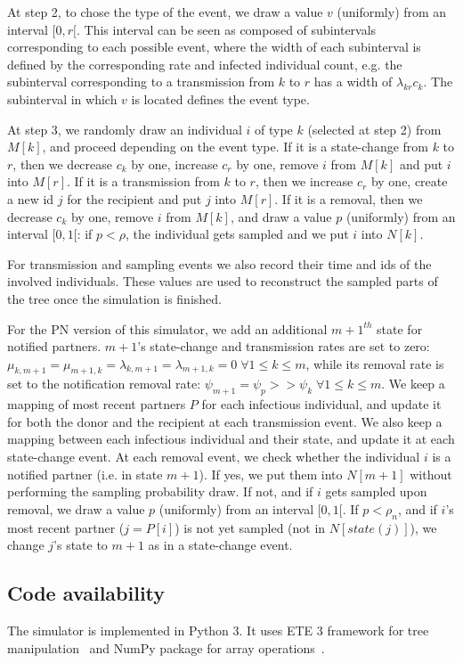 \documentclass[a4paper,10pt]{article}
\begin{document}
At step 2, to chose the type of the event, we draw a value $v$ (uniformly) from an interval $[0, r[$. This interval can be seen as composed of subintervals corresponding to each possible event, where the width of each subinterval is defined by the corresponding rate and infected individual count, e.g. the subinterval corresponding to a transmission from $k$ to $r$ has a width of $\lambda_{kr}c_k$. The subinterval in which $v$ is located defines the event type.

At step 3, we randomly draw an individual $i$ of type $k$ (selected at step 2) from $M[k]$, and proceed depending on the event type. If it is a state-change from $k$ to $r$, then we decrease $c_k$ by one, increase $c_r$ by one, remove $i$ from $M[k]$ and put $i$ into $M[r]$. If it is a transmission from $k$ to $r$, then we increase $c_r$ by one, create a new id $j$ for the recipient and put $j$ into $M[r]$. If it is a removal, then we decrease $c_k$ by one, remove $i$ from $M[k]$, and draw a value $p$ (uniformly) from an interval $[0, 1[$: if $p < \rho$, the individual gets sampled and we put $i$ into $N[k]$. 

For transmission and sampling events we also record their time and ids of the involved individuals. These values are used to reconstruct the sampled parts of the tree once the simulation is finished.


For the PN version of this simulator, we add an additional $m+1^{th}$ state for notified partners. $m + 1$'s state-change and transmission rates are set to zero: $\mu_{k,m+1} = \mu_{m+1,k} = \lambda_{k,m+1} = \lambda_{m+1,k} = 0\; \forall 1 \leq k \leq m$, while its removal rate is set to the notification removal rate: $\psi_{m+1} = \psi_p >> \psi_k\; \forall 1 \leq k \leq m$. We keep a mapping of most recent partners $P$ for each infectious individual, and update it for both the donor and the recipient at each transmission event. We also keep a mapping between each infectious individual and their state, and update it at each state-change event. At each removal event, we check whether the individual $i$ is a notified partner (i.e. in state $m+1$). If yes, we put them into $N[m+1]$ without performing the sampling probability draw. If not, and if $i$ gets sampled upon removal, we draw a value $p$ (uniformly) from an interval $[0, 1[$. If $p < \rho_n$, and if $i$'s most recent partner ($j = P[i]$) is not yet sampled (not in $N[state(j)]$), we change $j$'s state to $m + 1$ as in a state-change event.


\subsection*{Code availability}
The simulator is implemented in Python 3. It uses ETE 3 framework for tree manipulation~\citep{Huerta-Cepas2016} and NumPy package for array operations~\citep{harris_array_2020}. 
\end{document}

